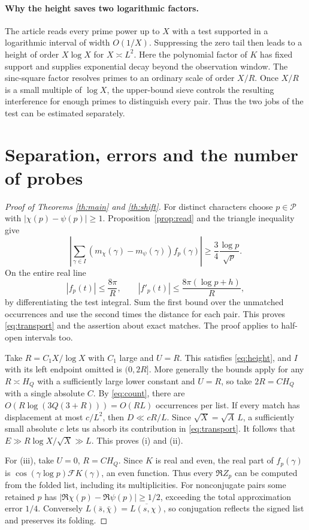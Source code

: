 \documentclass[11pt,letterpaper]{article}
\newcommand{\F}{\mathcal F}\newcommand{\Pp}{\mathcal P}
\begin{document}
\paragraph{Why the height saves two logarithmic factors.}
The article reads every prime power up to $X$ with a test supported in a logarithmic interval of width $O(1/X)$. Suppressing the zero tail then leads to a height of order $X\log X$ for $X\asymp L^2$. Here the polynomial factor of $K$ has fixed support and supplies exponential decay beyond the observation window. The sinc-square factor resolves primes to an ordinary scale of order $X/R$. Once $X/R$ is a small multiple of $\log X$, the upper-bound sieve controls the resulting interference for enough primes to distinguish every pair. Thus the two jobs of the test can be estimated separately.

\section{Separation, errors and the number of probes}
\begin{proof}[Proof of Theorems \ref{th:main} and \ref{th:shift}]
For distinct characters choose $p\in\Pp$ with $|\chi(p)-\psi(p)|\ge1$. Proposition~\ref{prop:read} and the triangle inequality give
\[
 \left|\sum_{\gamma\in I}(m_\chi(\gamma)-m_\psi(\gamma))f_p(\gamma)\right|
 \ge\frac34\frac{\log p}{\sqrt p}.
\]
On the entire real line
\[
 |f_p(t)|\le\frac{8\pi}{R},\qquad |f'_p(t)|\le\frac{8\pi(\log p+h)}{R},
\]
by differentiating the test integral. Sum the first bound over the unmatched occurrences and use the second times the distance for each pair. This proves \eqref{eq:transport} and the assertion about exact matches. The proof applies to half-open intervals too.

Take $R=C_1X/\log X$ with $C_1$ large and $U=R$. This satisfies \eqref{eq:height}, and $I$ with its left endpoint omitted is $(0,2R]$. More generally the bounds apply for any $R\asymp H_Q$ with a sufficiently large lower constant and $U=R$, so take $2R=C H_Q$ with a single absolute $C$. By \eqref{eq:count}, there are $O(R\log(3Q(3+R)))=O(RL)$ occurrences per list. If every match has displacement at most $c/L^2$, then $D\ll cR/L$. Since $\sqrt X=\sqrt A\,L$, a sufficiently small absolute $c$ lets us absorb its contribution in \eqref{eq:transport}. It follows that $E\gg R\log X/\sqrt X\gg L$. This proves (i) and (ii).

For (iii), take $U=0$, $R=C H_Q$. Since $K$ is real and even, the real part of $f_p(\gamma)$ is $\cos(\gamma\log p)\F K(\gamma)$, an even function. Thus every $\Re Z_p$ can be computed from the folded list, including its multiplicities. For nonconjugate pairs some retained $p$ has $|\Re\chi(p)-\Re\psi(p)|\ge1/2$, exceeding the total approximation error $1/4$. Conversely $L(\bar s,\bar\chi)=\overline{L(s,\chi)}$, so conjugation reflects the signed list and preserves its folding.
\end{proof}
\end{document}
